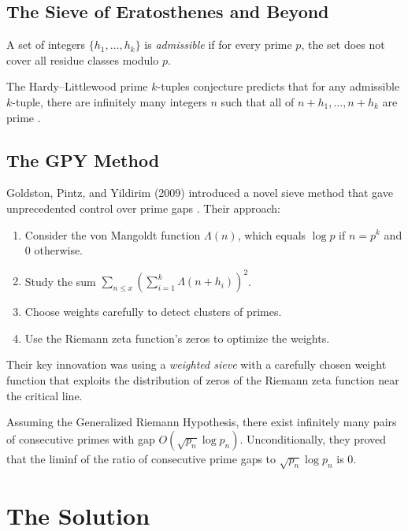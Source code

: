 \subsection{The Sieve of Eratosthenes and Beyond}

\begin{definition}
A set of integers $\{h_1, \ldots, h_k\}$ is \emph{admissible} if for every prime $p$, the set does not cover all residue classes modulo $p$.
\end{definition}

The Hardy--Littlewood prime $k$-tuples conjecture predicts that for any admissible $k$-tuple, there are infinitely many integers $n$ such that all of $n+h_1, \ldots, n+h_k$ are prime \cite{hardy1923}.

\subsection{The GPY Method}

Goldston, Pintz, and Yildirim (2009) introduced a novel sieve method that gave unprecedented control over prime gaps \cite{gpy2009}. Their approach:

\begin{enumerate}
\item Consider the von Mangoldt function $\Lambda(n)$, which equals $\log p$ if $n = p^k$ and 0 otherwise.
\item Study the sum $\sum_{n \leq x} \left(\sum_{i=1}^k \Lambda(n+h_i)\right)^2$.
\item Choose weights carefully to detect clusters of primes.
\item Use the Riemann zeta function's zeros to optimize the weights.
\end{enumerate}

Their key innovation was using a \emph{weighted sieve} with a carefully chosen weight function that exploits the distribution of zeros of the Riemann zeta function near the critical line.

\begin{theorem}
Assuming the Generalized Riemann Hypothesis, there exist infinitely many pairs of consecutive primes with gap $O(\sqrt{p_n} \log p_n)$. Unconditionally, they proved that the liminf of the ratio of consecutive prime gaps to $\sqrt{p_n} \log p_n$ is 0.
\end{theorem}

\section{The Solution}

